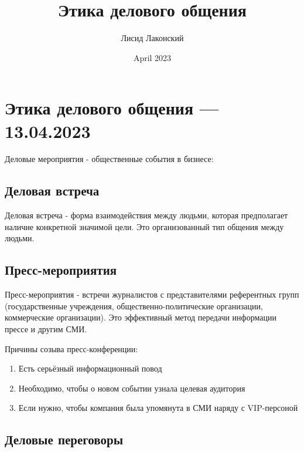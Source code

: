 \documentclass[a4paper,14pt]{extarticle}
\title{Этика делового общения}
\author{Лисид Лаконский}
\date{April 2023}
\begin{document}
\raggedright

\maketitle
\tableofcontents
\pagebreak

\section{Этика делового общения — 13.04.2023}

Деловые мероприятия - общественные события в бизнесе:

\begin{multienumerate}
\end{multienumerate}

\subsection{Деловая встреча}

Деловая встреча - форма взаимодействия между людьми, которая предполагает наличие конкретной значимой цели. Это организованный тип общения между людьми.

\subsection{Пресс-мероприятия}

Пресс-мероприятия - встречи журналистов с представителями референтных групп (государственные учреждения, общественно-политические организации, коммерческие организации). Это эффективный метод передачи информации прессе и другим СМИ.

Причины созыва пресс-конференции:

\begin{enumerate}
    \item Есть серьёзный информационный повод
    \item Необходимо, чтобы о новом событии узнала целевая аудитория
    \item Если нужно, чтобы компания была упомянута в СМИ наряду с VIP-персоной
\end{enumerate}

\subsection{Деловые переговоры}
\end{document}
